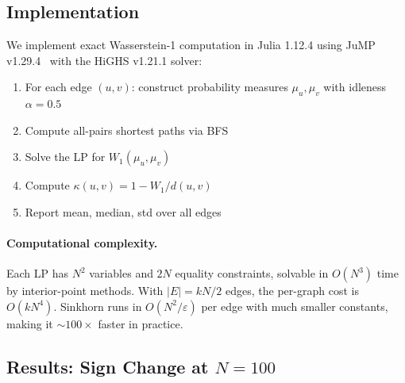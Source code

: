 \documentclass[12pt]{article}
\newcommand{\Wone}{W_1}
\begin{document}
\subsection{Implementation}

We implement exact Wasserstein-1 computation in Julia 1.12.4 using JuMP v1.29.4~\cite{JuMP}
with the HiGHS v1.21.1 solver:

\begin{enumerate}
  \item For each edge $(u,v)$: construct probability measures $\mu_u, \mu_v$ with
  idleness $\alpha = 0.5$
  \item Compute all-pairs shortest paths via BFS
  \item Solve the LP for $\Wone(\mu_u, \mu_v)$
  \item Compute $\kappa(u,v) = 1 - W_1/d(u,v)$
  \item Report mean, median, std over all edges
\end{enumerate}

\paragraph{Computational complexity.} Each LP has $N^2$ variables and $2N$ equality
constraints, solvable in $O(N^3)$ time by interior-point methods. With $|E| = kN/2$ edges,
the per-graph cost is $O(kN^4)$. Sinkhorn runs in $O(N^2/\varepsilon)$ per edge with much
smaller constants, making it $\sim\!100\times$ faster in practice.

\subsection{Results: Sign Change at $N = 100$}
\end{document}
